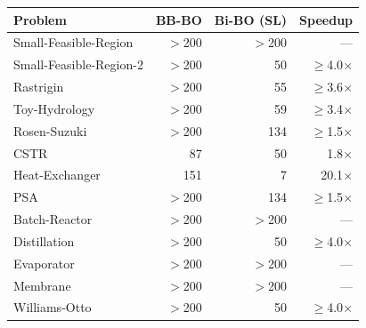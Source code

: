 \documentclass[12pt,a4paper]{article}%
\theoremstyle{plain}%
\theoremstyle{remark}%
\theoremstyle{definition}%
\providecommand{\DIFaddend}{} %
\DeclareRobustCommand{\DIFaddend}{\DIFOaddend \let\includegraphics\DIFOincludegraphics} %
\begin{document}
\begin{appendices}
\begin{table}[htbp]
\label{tab:convergence_speed}
\begin{tabular}{@{}lrrr@{}}
\toprule
\textbf{Problem} & \textbf{BB-BO} & \textbf{Bi-BO (SL)} & \textbf{Speedup} \\
\midrule
Small-Feasible-Region   & $>$200 & $>$200 & ---       \\
Small-Feasible-Region-2 & $>$200 & 50     & $\geq$4.0$\times$  \\
Rastrigin               & $>$200 & 55     & $\geq$3.6$\times$  \\
Toy-Hydrology           & $>$200 & 59     & $\geq$3.4$\times$  \\
Rosen-Suzuki            & $>$200 & 134    & $\geq$1.5$\times$  \\
\midrule
CSTR                    & 87     & 50     & 1.8$\times$  \\
Heat-Exchanger          & 151    & 7      & 20.1$\times$ \\
PSA                     & $>$200 & 134    & $\geq$1.5$\times$  \\
Batch-Reactor           & $>$200 & $>$200 & ---       \\
Distillation            & $>$200 & 50     & $\geq$4.0$\times$  \\
Evaporator              & $>$200 & $>$200 & ---       \\
Membrane                & $>$200 & $>$200 & ---       \\
Williams-Otto           & $>$200 & 50     & $\geq$4.0$\times$  \\
\bottomrule
\end{tabular}
\end{table}

\DIFaddend 


\end{appendices}
\end{document}

